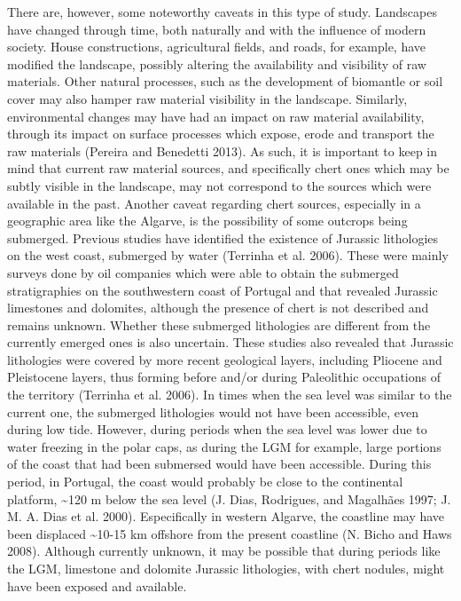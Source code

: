 \documentclass[
  a4paper,
  DIV=11,
  numbers=noendperiod]{scrreprt}
\begin{document}
There are, however, some noteworthy caveats in this type of study.
Landscapes have changed through time, both naturally and with the
influence of modern society. House constructions, agricultural fields,
and roads, for example, have modified the landscape, possibly altering
the availability and visibility of raw materials. Other natural
processes, such as the development of biomantle or soil cover may also
hamper raw material visibility in the landscape. Similarly,
environmental changes may have had an impact on raw material
availability, through its impact on surface processes which expose,
erode and transport the raw materials (Pereira and Benedetti 2013). As
such, it is important to keep in mind that current raw material sources,
and specifically chert ones which may be subtly visible in the
landscape, may not correspond to the sources which were available in the
past. Another caveat regarding chert sources, especially in a geographic
area like the Algarve, is the possibility of some outcrops being
submerged. Previous studies have identified the existence of Jurassic
lithologies on the west coast, submerged by water (Terrinha et al.
2006). These were mainly surveys done by oil companies which were able
to obtain the submerged stratigraphies on the southwestern coast of
Portugal and that revealed Jurassic limestones and dolomites, although
the presence of chert is not described and remains unknown. Whether
these submerged lithologies are different from the currently emerged
ones is also uncertain. These studies also revealed that Jurassic
lithologies were covered by more recent geological layers, including
Pliocene and Pleistocene layers, thus forming before and/or during
Paleolithic occupations of the territory (Terrinha et al. 2006). In
times when the sea level was similar to the current one, the submerged
lithologies would not have been accessible, even during low tide.
However, during periods when the sea level was lower due to water
freezing in the polar caps, as during the LGM for example, large
portions of the coast that had been submersed would have been
accessible. During this period, in Portugal, the coast would probably be
close to the continental platform, \textasciitilde120 m below the sea
level (J. Dias, Rodrigues, and Magalhães 1997; J. M. A. Dias et al.
2000). Especifically in western Algarve, the coastline may have been
displaced \textasciitilde10-15 km offshore from the present coastline
(N. Bicho and Haws 2008). Although currently unknown, it may be possible
that during periods like the LGM, limestone and dolomite Jurassic
lithologies, with chert nodules, might have been exposed and available.
\end{document}
